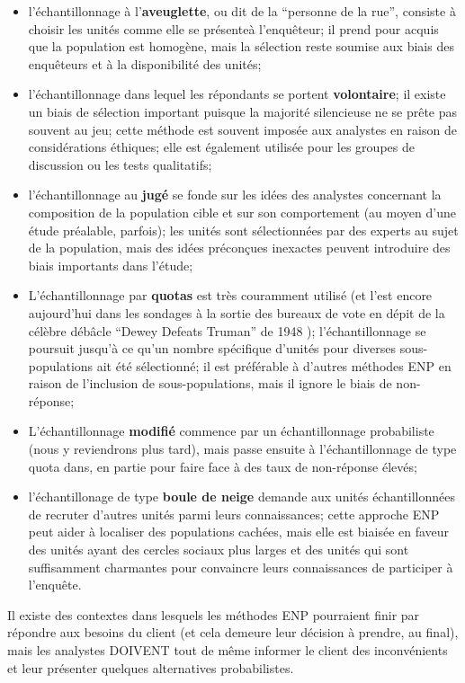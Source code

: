 \begin{itemize}[noitemsep]
\item l'échantillonnage \`a l'\textbf{aveuglette}, ou dit de la ``personne de la rue'', consiste \`a choisir les unit\'es comme elle se pr\'esente\`a l'enqu\^eteur; il prend pour acquis que la population est homogène, mais la sélection reste soumise aux biais des enquêteurs et à la disponibilité des unités;
\item l'\'echantillonnage dans lequel les r\'epondants se portent \textbf{volontaire}; il existe un biais de sélection important puisque la majorité silencieuse ne se pr\^ete pas souvent au jeu; cette méthode est souvent imposée aux analystes en raison de considérations éthiques; elle est également utilisée pour les groupes de discussion ou les tests qualitatifs;
\item l'échantillonnage au \textbf{jug\'e} se fonde sur les idées des analystes concernant la composition de la population cible et sur son comportement (au moyen d'une étude préalable, parfois); les unités sont sélectionnées par des experts au sujet de la population, mais des idées préconçues inexactes peuvent introduire des biais importants dans l'étude;
\item L'échantillonnage par \textbf{quotas} est très couramment utilisé (et l'est encore aujourd'hui dans les sondages à la sortie des bureaux de vote en dépit de la  célèbre débâcle ``Dewey Defeats Truman'' de 1948 \cite{DC_DDT}); l'échantillonnage se poursuit jusqu'à ce qu'un nombre spécifique d'unités pour diverses sous-populations ait été sélectionné; il est préférable \`a
 d'autres méthodes ENP en raison de l'inclusion de sous-populations, mais il ignore le biais de non-réponse;
\item L'échantillonnage \textbf{modifié} commence par un échantillonnage probabiliste (nous y reviendrons plus tard), mais passe ensuite à l'échantillonnage de type quota dans, en partie pour faire face à des taux de non-réponse élevés;
\item l'\'echantillonage de type \textbf{boule de neige} demande aux unités échantillonnées de recruter d'autres unités parmi leurs connaissances; cette approche ENP peut aider à localiser des populations cachées, mais elle est biaisée en faveur des unités ayant des cercles sociaux plus larges et des unités qui sont suffisamment charmantes pour convaincre leurs connaissances de participer \`a l'enquête. 
\end{itemize}
Il existe des contextes dans lesquels les méthodes ENP pourraient finir par répondre aux besoins du client (et cela demeure leur décision \`a prendre, au final), mais les analystes DOIVENT tout de même informer le client des inconvénients et leur présenter quelques alternatives probabilistes.  
